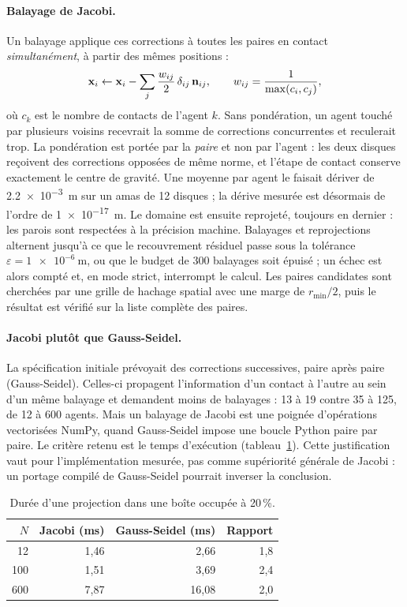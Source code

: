 \paragraph{Balayage de Jacobi.}
Un balayage applique ces corrections à toutes les paires en contact
\emph{simultanément}, à partir des mêmes positions :
\[
\mathbf{x}_i \leftarrow \mathbf{x}_i-\sum_{j}\frac{w_{ij}}{2}\,\delta_{ij}\,\mathbf{n}_{ij},
\qquad
w_{ij}=\frac{1}{\max(c_i,c_j)} ,
\]
où $c_k$ est le nombre de contacts de l'agent $k$. Sans pondération, un agent
touché par plusieurs voisins recevrait la somme de corrections concurrentes et
reculerait trop. La pondération est portée par la \emph{paire} et non par
l'agent : les deux disques reçoivent des corrections opposées de même norme, et
l'étape de contact conserve exactement le centre de gravité. Une moyenne par
agent le faisait dériver de \SI{2.2e-3}{\metre} sur un amas de 12 disques ; la
dérive mesurée est désormais de l'ordre de \SI{1e-17}{\metre}. Le domaine est
ensuite reprojeté, toujours en dernier : les parois sont respectées à la
précision machine. Balayages et reprojections alternent jusqu'à ce que le
recouvrement résiduel passe sous la tolérance $\varepsilon=\SI{1e-6}{\metre}$,
ou que le budget de 300 balayages soit épuisé ; un échec est alors compté et,
en mode strict, interrompt le calcul. Les paires candidates sont cherchées par
une grille de hachage spatial avec une marge de $r_{\min}/2$, puis le résultat
est vérifié sur la liste complète des paires.

\paragraph{Jacobi plutôt que Gauss-Seidel.}
La spécification initiale prévoyait des corrections successives, paire après
paire (Gauss-Seidel). Celles-ci propagent l'information d'un contact à l'autre
au sein d'un même balayage et demandent moins de balayages : 13 à 19 contre 35
à 125, de 12 à 600 agents. Mais un balayage de Jacobi est une poignée
d'opérations vectorisées NumPy, quand Gauss-Seidel impose une boucle Python
paire par paire. Le critère retenu est le temps d'exécution
(tableau~\ref{tab:jacobi-gs}). Cette justification vaut pour l'implémentation mesurée,
pas comme supériorité générale de Jacobi : un portage compilé de Gauss-Seidel
pourrait inverser la conclusion.

\begin{table}[ht]
\centering
\caption{Durée d'une projection dans une boîte occupée à 20\,\%.}
\label{tab:jacobi-gs}
\begin{tabular}{rrrr}
\toprule
$N$ & Jacobi (ms) & Gauss-Seidel (ms) & Rapport \\
\midrule
12 & 1,46 & 2,66 & 1,8 \\
100 & 1,51 & 3,69 & 2,4 \\
600 & 7,87 & 16,08 & 2,0 \\
\bottomrule
\end{tabular}
\end{table}

